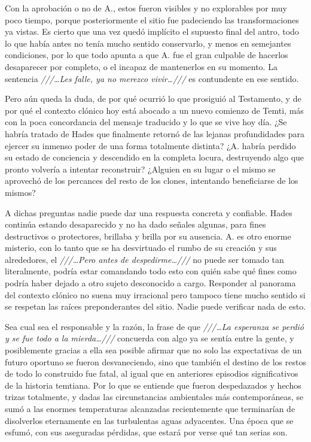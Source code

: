 \documentclass[
  spanish,
]{book}
\begin{document}
Con la aprobación o no de A., estos fueron visibles y no explorables por muy poco tiempo, porque posteriormente el sitio fue padeciendo las transformaciones ya vistas. Es cierto que una vez quedó implícito el supuesto final del antro, todo lo que había antes no tenía mucho sentido conservarlo, y menos en semejantes condiciones, por lo que todo apunta a que A. fue el gran culpable de hacerlos desaparecer por completo, o el incapaz de mantenerlos en su momento. La sentencia \emph{///\ldots Les falle, ya no merezco vivir\ldots///} es contundente en ese sentido.

Pero aún queda la duda, de por qué ocurrió lo que prosiguió al Testamento, y de por qué el contexto clónico hoy está abocado a un nuevo comienzo de Temti, más con la poca concordancia del mensaje traducido y lo que se vive hoy día. ¿Se habría tratado de Hades que finalmente retornó de las lejanas profundidades para ejercer su inmenso poder de una forma totalmente distinta? ¿A. habría perdido su estado de conciencia y descendido en la completa locura, destruyendo algo que pronto volvería a intentar reconstruir? ¿Alguien en su lugar o el mismo se aprovechó de los percances del resto de los clones, intentando beneficiarse de los mismos?

A dichas preguntas nadie puede dar una respuesta concreta y confiable.
Hades continúa estando desaparecido y no ha dado señales algunas, para fines destructivos o protectores, brillaba y brilla por su ausencia. A. es otro enorme misterio, con lo tanto que se ha desvirtuado el rumbo de su creación y sus alrededores, el \emph{///\ldots Pero antes de despedirme\ldots///} no puede ser tomado tan literalmente, podría estar comandando todo esto con quién sabe qué fines como podría haber dejado a otro sujeto desconocido a cargo. Responder al panorama del contexto clónico no suena muy irracional pero tampoco tiene mucho sentido si se respetan las raíces preponderantes del sitio.
Nadie puede verificar nada de esto.

Sea cual sea el responsable y la razón, la frase de que \emph{///\ldots La esperanza se perdió y se fue todo a la mierda\ldots///} concuerda con algo ya se sentía entre la gente, y posiblemente gracias a ella sea posible afirmar que no solo las expectativas de un futuro oportuno se fueron desvaneciendo, sino que también el destino de los restos de todo lo construido fue fatal, al igual que en anteriores episodios significativos de la historia temtiana. Por lo que se entiende que fueron despedazados y hechos trizas totalmente, y dadas las circunstancias ambientales más contemporáneas, se sumó a las enormes temperaturas alcanzadas recientemente que terminarían de disolverlos eternamente en las turbulentas aguas adyacentes. Una época que se esfumó, con sus aseguradas pérdidas, que estará por verse qué tan serias son.
\end{document}
